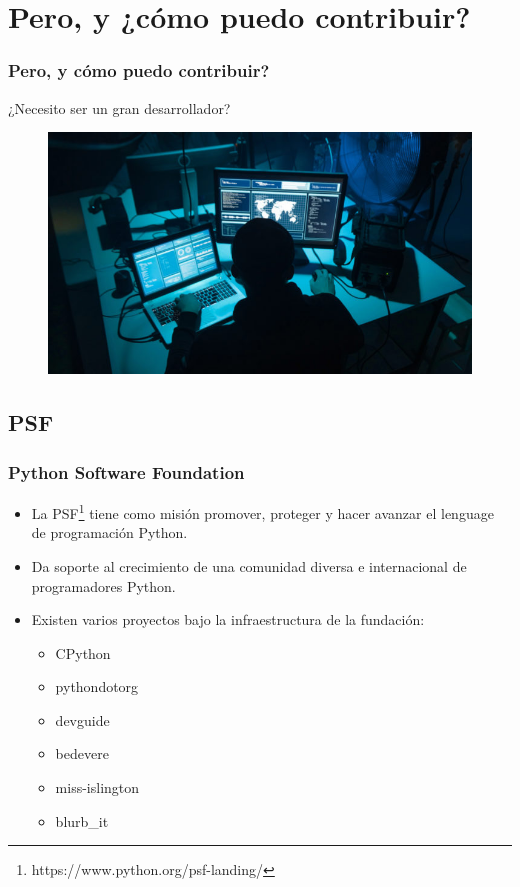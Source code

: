 \documentclass[spanish]{beamer}
\begin{document}
\section{Pero, y ¿cómo puedo contribuir?}
\begin{frame}
	\frametitle{Pero, y cómo puedo contribuir?}
	¿Necesito ser un gran desarrollador? 
        \begin{figure}
		\centering
		\includegraphics[width=1\linewidth]{image1.jpg}
	\end{figure}
\end{frame}

\subsection{PSF}
\begin{frame}
	\frametitle{Python Software Foundation}
	\begin{itemize}
		\item La PSF\footnote{https://www.python.org/psf-landing/} tiene como misión promover, proteger y hacer avanzar el 
			lenguage de programación Python.
		\item Da soporte al crecimiento de una comunidad diversa e internacional
			de programadores Python.
		\item Existen varios proyectos bajo la infraestructura de la fundación:
			\begin{itemize}
				\item CPython
				\item pythondotorg
				\item devguide
				\item bedevere
				\item miss-islington
				\item blurb\_it
			\end{itemize}
	\end{itemize}
\end{frame}
\end{document}
